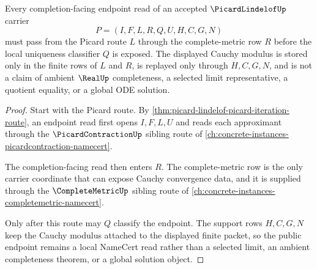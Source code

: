 \begin{theorem}
\label{thm:picard-lindelof-cauchy-completion-route}
Every completion-facing endpoint read of an accepted $\PicardLindelofUp$ carrier
$$
P=(I,F,L,R,Q,U,H,C,G,N)
$$
must pass from the Picard route $L$ through the complete-metric row $R$ before the local uniqueness classifier $Q$ is exposed. The displayed Cauchy modulus is stored only in the finite rows of $L$ and $R$, is replayed only through $H,C,G,N$, and is not a claim of ambient $\RealUp$ completeness, a selected limit representative, a quotient equality, or a global ODE solution.
\end{theorem}
\begin{proof}
Start with the Picard route. By \autoref{thm:picard-lindelof-picard-iteration-route}, an endpoint read first opens $I,F,L,U$ and reads each approximant through the $\PicardContractionUp$ sibling route of \autoref{ch:concrete-instances-picardcontraction-namecert}.

The completion-facing read then enters $R$. The complete-metric row is the only carrier coordinate that can expose Cauchy convergence data, and it is supplied through the $\CompleteMetricUp$ sibling route of \autoref{ch:concrete-instances-completemetric-namecert}.

Only after this route may $Q$ classify the endpoint. The support rows $H,C,G,N$ keep the Cauchy modulus attached to the displayed finite packet, so the public endpoint remains a local NameCert read rather than a selected limit, an ambient completeness theorem, or a global solution object.
\end{proof}




